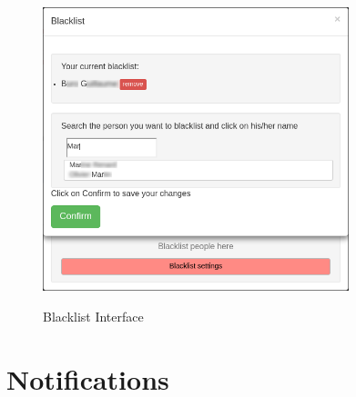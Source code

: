 \begin{figure}
\centering
{\includegraphics[width=3.5in]{images/blacklist.png}}
\caption{Blacklist Interface}
\label{fig:blacklist}
\end{figure}
\section{Notifications}